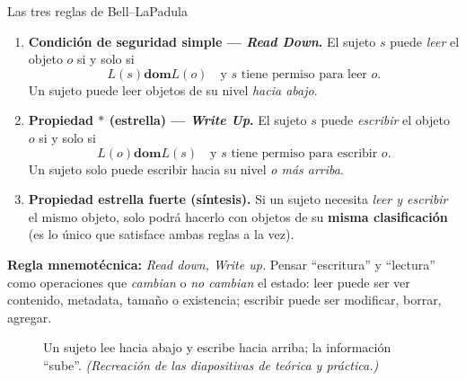 \documentclass[11pt,a4paper]{article}
\newcommand{\dom}{\mathrel{\mathbf{dom}}}        %
\newcommand{\Lvl}{L}                              %
\begin{document}
\begin{defbox}{Las tres reglas de Bell--LaPadula}
\begin{enumerate}[leftmargin=1.7em,itemsep=4pt]
  \item \textbf{Condición de seguridad simple — \emph{Read Down}.} El sujeto $s$ puede
        \emph{leer} el objeto $o$ si y solo si
        \[ \Lvl(s) \dom \Lvl(o) \quad\text{y } s \text{ tiene permiso para leer } o. \]
        Un sujeto puede leer objetos de su nivel \emph{hacia abajo}.
  \item \textbf{Propiedad $\ast$ (estrella) — \emph{Write Up}.} El sujeto $s$ puede
        \emph{escribir} el objeto $o$ si y solo si
        \[ \Lvl(o) \dom \Lvl(s) \quad\text{y } s \text{ tiene permiso para escribir } o. \]
        Un sujeto solo puede escribir hacia su nivel \emph{o más arriba}.
  \item \textbf{Propiedad estrella fuerte (síntesis).} Si un sujeto necesita
        \emph{leer y escribir} el mismo objeto, solo podrá hacerlo con objetos de su
        \textbf{misma clasificación} (es lo único que satisface ambas reglas a la vez).
\end{enumerate}
\textbf{Regla mnemotécnica:} \emph{Read down, Write up.} Pensar ``escritura'' y ``lectura''
como operaciones que \emph{cambian} o \emph{no cambian} el estado: leer puede ser ver
contenido, metadata, tamaño o existencia; escribir puede ser modificar, borrar, agregar.
\end{defbox}

\begin{figure}[h]
\centering
{}
\caption{Un sujeto lee hacia abajo y escribe hacia arriba; la información ``sube''.
\textit{(Recreación de las diapositivas de teórica y práctica.)}}
\end{figure}
\end{document}

